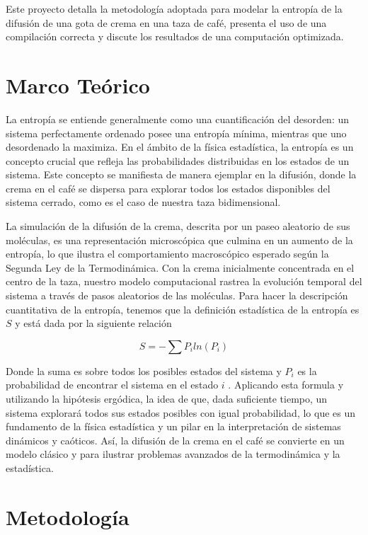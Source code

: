 \documentclass{article}
\begin{document}
    Este proyecto detalla la metodología adoptada para modelar la entropía de la difusión de una gota de crema en una taza de café, presenta el uso de una compilación correcta y discute los resultados de una computación optimizada.

\section*{Marco Teórico}

    La entropía se entiende generalmente como una cuantificación del desorden: un sistema perfectamente ordenado posee una entropía mínima, mientras que uno desordenado la maximiza. En el ámbito de la física estadística, la entropía es un concepto crucial que refleja las probabilidades distribuidas en los estados de un sistema. Este concepto se manifiesta de manera ejemplar en la difusión, donde la crema en el café se dispersa para explorar todos los estados disponibles del sistema cerrado, como es el caso de nuestra taza bidimensional.

    La simulación de la difusión de la crema, descrita por un paseo aleatorio de sus moléculas, es una representación microscópica que culmina en un aumento de la entropía, lo que ilustra el comportamiento macroscópico esperado según la Segunda Ley de la Termodinámica. Con la crema inicialmente concentrada en el centro de la taza, nuestro modelo computacional rastrea la evolución temporal del sistema a través de pasos aleatorios de las moléculas. Para hacer la descripción cuantitativa de la entropía, tenemos que la definición estadística de la entropía es $S$ y está dada por la siguiente relación

    \begin{equation}
        S = - \sum P_i ln( P_i )
    \end{equation}
    
    Donde la suma es sobre todos los posibles estados del sistema y $P_i$ es la probabilidad de encontrar el sistema en el estado $i$ \cite{paper}. Aplicando esta formula y utilizando la hipótesis ergódica, la idea de que, dada suficiente tiempo, un sistema explorará todos sus estados posibles con igual probabilidad, lo que es un fundamento de la física estadística y un pilar en la interpretación de sistemas dinámicos y caóticos. Así, la difusión de la crema en el café se convierte en un modelo clásico y para ilustrar problemas avanzados de la termodinámica y la estadística.


\section*{Metodología}
\end{document}
